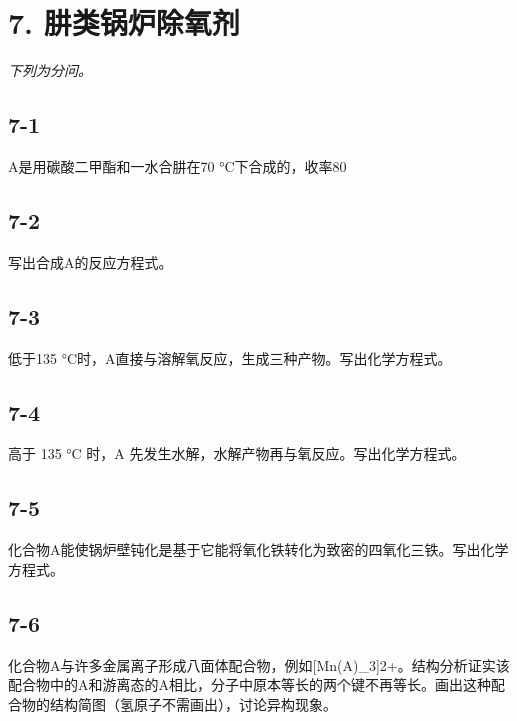 \section*{7. 肼类锅炉除氧剂}
\textit{下列为分问。}

\subsection*{7-1}
A是⽤碳酸⼆甲酯和⼀⽔合肼在70 °C下合成的，收率80%

\subsection*{7-2}
写出合成A的反应⽅程式。

\subsection*{7-3}
低于135 °C时，A直接与溶解氧反应，⽣成三种产物。写出化学⽅程式。

\subsection*{7-4}
⾼于 135 °C 时，A 先发⽣⽔解，⽔解产物再与氧反应。写出化学⽅程式。

\subsection*{7-5}
化合物A能使锅炉壁钝化是基于它能将氧化铁转化为致密的四氧化三铁。写出化学⽅程式。

\subsection*{7-6}
化合物A与许多⾦属离⼦形成⼋⾯体配合物，例如[Mn(A)_{3}]2+。结构分析证实该配合物中的A和游离态的A相⽐，分⼦中原本等⻓的两个键不再等⻓。画出这种配合物的结构简图（氢原⼦不需画出），讨论异构现象。
